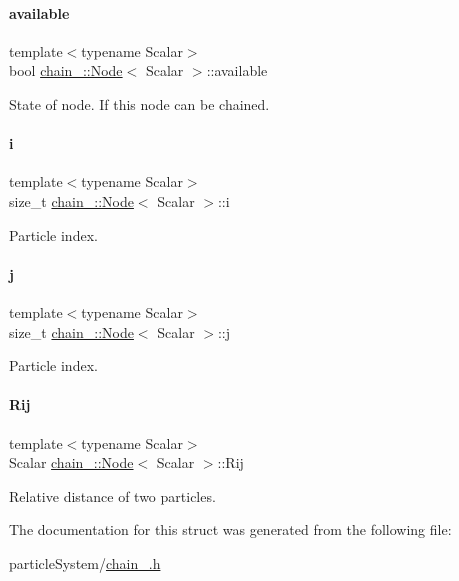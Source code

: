 \paragraph{\texorpdfstring{available}{available}}
{\footnotesize\ttfamily template$<$typename Scalar$>$ \\
bool \mbox{\hyperlink{structchain_1_1_node}{chain_\+::\+Node}}$<$ Scalar $>$\+::available}

State of node. If this node can be chained. \mbox{\label{structchain_1_1_node_a289ef3bad054158a446e53481c2a9d17}} 
\paragraph{\texorpdfstring{i}{i}}
{\footnotesize\ttfamily template$<$typename Scalar$>$ \\
size\+\_\+t \mbox{\hyperlink{structchain_1_1_node}{chain_\+::\+Node}}$<$ Scalar $>$\+::i}

Particle index. \mbox{\label{structchain_1_1_node_aa41c0c59d6cdd4263a72b9e5284aa3d9}} 
\paragraph{\texorpdfstring{j}{j}}
{\footnotesize\ttfamily template$<$typename Scalar$>$ \\
size\+\_\+t \mbox{\hyperlink{structchain_1_1_node}{chain_\+::\+Node}}$<$ Scalar $>$\+::j}

Particle index. \mbox{\label{structchain_1_1_node_a3a9ca49370eba9c8ce1d6b2a146c93ee}} 
\paragraph{\texorpdfstring{Rij}{Rij}}
{\footnotesize\ttfamily template$<$typename Scalar$>$ \\
Scalar \mbox{\hyperlink{structchain_1_1_node}{chain_\+::\+Node}}$<$ Scalar $>$\+::Rij}

Relative distance of two particles. 

The documentation for this struct was generated from the following file\+:\begin{DoxyCompactItemize}
\item 
particle\+System/\mbox{\hyperlink{chain_8h}{chain_.\+h}}\end{DoxyCompactItemize}
